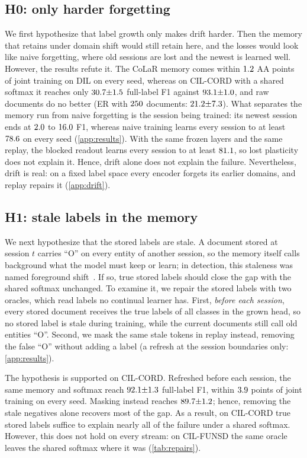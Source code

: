 \documentclass[10pt,twocolumn,letterpaper]{article}
\begin{document}
\subsection{H0: only harder forgetting}
\label{sec:h0}
We first hypothesize that label growth only makes drift harder. Then the memory that retains under domain shift would still retain here, and the losses would look like naive forgetting, where old sessions are lost and the newest is learned well. However, the results refute it. The CoLaR memory comes within $1.2$ AA points of joint training on DIL on every seed, whereas on CIL-CORD with a shared softmax it reaches only $30.7{\pm}1.5$ full-label F1 against $93.1{\pm}1.0$, and raw documents do no better (ER with $250$ documents: $21.2{\pm}7.3$). What separates the memory run from naive forgetting is the session being trained: its newest session ends at $2.0$ to $16.0$ F1, whereas naive training learns every session to at least $78.6$ on every seed (\cref{app:results}). With the same frozen layers and the same replay, the blocked readout learns every session to at least $81.1$, so lost plasticity does not explain it. Hence, drift alone does not explain the failure. Nevertheless, drift is real: on a fixed label space every encoder forgets its earlier domains, and replay repairs it (\cref{app:drift}).

\subsection{H1: stale labels in the memory}
\label{sec:h1}
We next hypothesize that the stored labels are stale. A document stored at session $t$ carries ``O'' on every entity of another session, so the memory itself calls background what the model must keep or learn; in detection, this staleness was named foreground shift~\citep{liu2023abr}. If so, true stored labels should close the gap with the shared softmax unchanged. To examine it, we repair the stored labels with two oracles, which read labels no continual learner has. First, \emph{before each session}, every stored document receives the true labels of all classes in the grown head, so no stored label is stale during training, while the current documents still call old entities ``O''. Second, we mask the same stale tokens in replay instead, removing the false ``O'' without adding a label (a refresh at the session boundaries only: \cref{app:results}).

The hypothesis is supported on CIL-CORD. Refreshed before each session, the same memory and softmax reach $92.1{\pm}1.3$ full-label F1, within $3.9$ points of joint training on every seed. Masking instead reaches $89.7{\pm}1.2$; hence, removing the stale negatives alone recovers most of the gap. As a result, on CIL-CORD true stored labels suffice to explain nearly all of the failure under a shared softmax. However, this does not hold on every stream: on CIL-FUNSD the same oracle leaves the shared softmax where it was (\cref{tab:repairs}).
\end{document}
